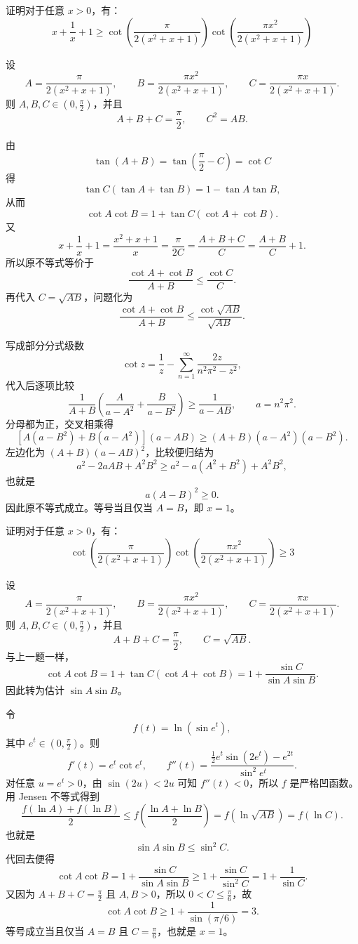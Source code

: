 \begin{example}[三角放缩]
    证明对于任意 $x > 0$，有：$$x + \frac{1}{x} + 1 \geqslant \cot\left(\frac{\pi}{2(x^2+x+1)}\right)\cot\left(\frac{\pi x^2}{2(x^2+x+1)}\right)$$
\end{example}
\begin{solution}
设
\[
A = \frac{\pi}{2(x^2+x+1)},\qquad B = \frac{\pi x^2}{2(x^2+x+1)},\qquad C = \frac{\pi x}{2(x^2+x+1)}.
\]
则 \(A,B,C\in(0,\frac{\pi}{2})\)，并且
\[
A+B+C=\frac{\pi}{2},\qquad C^2=AB.
\]

由
\[
\tan(A+B)=\tan\left(\frac{\pi}{2}-C\right)=\cot C
\]
得
\[
\tan C(\tan A+\tan B)=1-\tan A\tan B,
\]
从而
\[
\cot A\cot B=1+\tan C(\cot A+\cot B).
\]
又
\[
x+\frac1x+1=\frac{x^2+x+1}{x}=\frac{\pi}{2C}=\frac{A+B+C}{C}=\frac{A+B}{C}+1.
\]
所以原不等式等价于
\[
\frac{\cot A+\cot B}{A+B}\le \frac{\cot C}{C}.
\]
再代入 \(C=\sqrt{AB}\)，问题化为
\[
\frac{\cot A+\cot B}{A+B}\le \frac{\cot \sqrt{AB}}{\sqrt{AB}}.
\]

写成部分分式级数
\[
\cot z = \frac{1}{z} - \sum_{n=1}^\infty \frac{2z}{n^2\pi^2 - z^2},
\]
代入后逐项比较
\[
\frac{1}{A+B} \left( \frac{A}{a - A^2} + \frac{B}{a - B^2} \right) \ge \frac{1}{a - AB},
\qquad a=n^2\pi^2.
\]
分母都为正，交叉相乘得
\[
[A(a-B^2)+B(a-A^2)](a-AB)\ge (A+B)(a-A^2)(a-B^2).
\]
左边化为 \((A+B)(a-AB)^2\)，比较便归结为
\[
a^2-2aAB+A^2B^2\ge a^2-a(A^2+B^2)+A^2B^2,
\]
也就是
\[
a(A-B)^2\ge0.
\]
因此原不等式成立。等号当且仅当 \(A=B\)，即 \(x=1\)。
\end{solution}

\begin{example}[三角放缩（二）]
    证明对于任意 $x > 0$，有：$$ \cot\left(\frac{\pi}{2(x^2+x+1)}\right)\cot\left(\frac{\pi x^2}{2(x^2+x+1)}\right)\geqslant 3$$
\end{example}
\begin{solution}
设
\[
A=\frac{\pi}{2(x^2+x+1)},\qquad B=\frac{\pi x^2}{2(x^2+x+1)},\qquad C=\frac{\pi x}{2(x^2+x+1)}.
\]
则 \(A,B,C\in(0,\frac{\pi}{2})\)，并且
\[
A+B+C=\frac{\pi}{2},\qquad C=\sqrt{AB}.
\]
与上一题一样，
\[
\cot A\cot B=1+\tan C(\cot A+\cot B)=1+\frac{\sin C}{\sin A\sin B}.
\]
因此转为估计 \(\sin A\sin B\)。

令
\[
f(t)=\ln(\sin e^t),
\]
其中 \(e^t\in(0,\frac{\pi}{2})\)。则
\[
f'(t)=e^t\cot e^t,\qquad
f''(t)=\frac{\frac12 e^t\sin(2e^t)-e^{2t}}{\sin^2 e^t}.
\]
对任意 \(u=e^t>0\)，由 \(\sin(2u)<2u\) 可知 \(f''(t)<0\)，所以 \(f\) 是严格凹函数。用 Jensen 不等式得到
\[
\frac{f(\ln A)+f(\ln B)}{2}\le f\!\left(\frac{\ln A+\ln B}{2}\right)=f(\ln\sqrt{AB})=f(\ln C).
\]
也就是
\[
\sin A\sin B\le \sin^2 C.
\]
代回去便得
\[
\cot A\cot B
=1+\frac{\sin C}{\sin A\sin B}
\ge 1+\frac{\sin C}{\sin^2 C}
=1+\frac1{\sin C}.
\]
又因为 \(A+B+C=\frac{\pi}{2}\) 且 \(A,B>0\)，所以 \(0<C\le\frac{\pi}{6}\)，故
\[
\cot A\cot B\ge 1+\frac1{\sin(\pi/6)}=3.
\]
等号成立当且仅当 \(A=B\) 且 \(C=\frac{\pi}{6}\)，也就是 \(x=1\)。
\end{solution}


